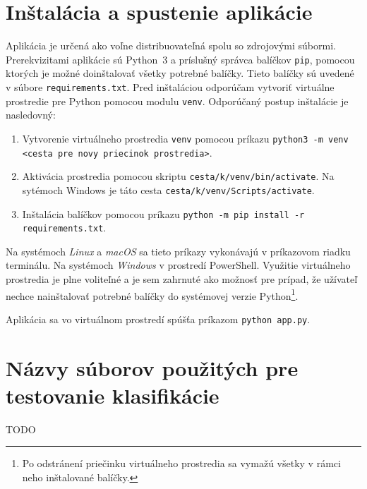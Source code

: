 
\chapter{Inštalácia a spustenie aplikácie} \label{sec:instalacia}
  Aplikácia je určená ako voľne distribuovateľná spolu so zdrojovými súbormi. Prerekvizitami aplikácie sú Python~3 a príslušný správca balíčkov \texttt{pip},
  pomocou ktorých je možné doinštalovať všetky potrebné balíčky. Tieto balíčky sú uvedené v súbore \texttt{requirements.txt}. Pred inštaláciou odporúčam
  vytvoriť virtuálne prostredie pre Python pomocou modulu \texttt{venv}. Odporúčaný postup inštalácie je nasledovný:
  \begin{enumerate}
    \item Vytvorenie virtuálneho prostredia \texttt{venv} pomocou príkazu \texttt{python3 -m venv <cesta pre novy priecinok prostredia>}.
    \item Aktivácia prostredia pomocou skriptu \texttt{cesta/k/venv/bin/activate}. Na sytémoch Windows je táto cesta \texttt{cesta/k/venv/Scripts/activate}.
    \item Inštalácia balíčkov pomocou príkazu \texttt{python -m pip install -r requirements.txt}.
  \end{enumerate}
  Na systémoch \emph{Linux} a \emph{macOS} sa tieto príkazy vykonávajú v príkazovom riadku terminálu. Na systémoch \emph{Windows} v prostredí PowerShell.
  Využitie virtuálneho prostredia je plne voliteľné a je sem zahrnuté ako možnosť pre prípad, že užívateľ nechce nainštalovať potrebné balíčky do systémovej
  verzie Python\footnote{Po odstránení priečinku virtuálneho prostredia sa vymažú všetky v rámci neho inštalované balíčky.}.

  Aplikácia sa vo virtuálnom prostredí spúšťa príkazom \texttt{python app.py}.

\chapter{Názvy súborov použitých pre testovanie klasifikácie} \label{priloha:zoznam_suborov}
  TODO





